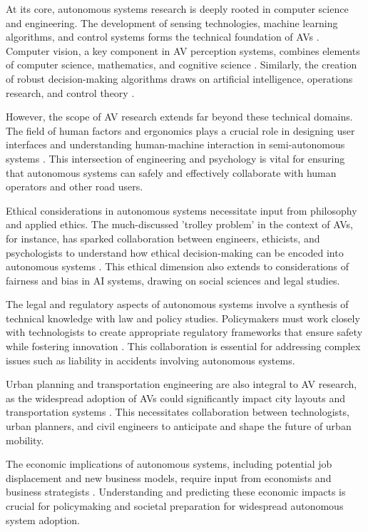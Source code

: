 At its core, autonomous systems research is deeply rooted in computer science and engineering. The development of sensing technologies, machine learning algorithms, and control systems forms the technical foundation of AVs \cite{Yurtsever2020}. Computer vision, a key component in AV perception systems, combines elements of computer science, mathematics, and cognitive science \cite{Grigorescu2020}. Similarly, the creation of robust decision-making algorithms draws on artificial intelligence, operations research, and control theory \cite{Kiran2021}.

However, the scope of AV research extends far beyond these technical domains. The field of human factors and ergonomics plays a crucial role in designing user interfaces and understanding human-machine interaction in semi-autonomous systems \cite{Endsley2017}. This intersection of engineering and psychology is vital for ensuring that autonomous systems can safely and effectively collaborate with human operators and other road users.

Ethical considerations in autonomous systems necessitate input from philosophy and applied ethics. The much-discussed 'trolley problem' in the context of AVs, for instance, has sparked collaboration between engineers, ethicists, and psychologists to understand how ethical decision-making can be encoded into autonomous systems \cite{Awad2018}. This ethical dimension also extends to considerations of fairness and bias in AI systems, drawing on social sciences and legal studies.

The legal and regulatory aspects of autonomous systems involve a synthesis of technical knowledge with law and policy studies. Policymakers must work closely with technologists to create appropriate regulatory frameworks that ensure safety while fostering innovation \cite{Cummings2021}. This collaboration is essential for addressing complex issues such as liability in accidents involving autonomous systems.

Urban planning and transportation engineering are also integral to AV research, as the widespread adoption of AVs could significantly impact city layouts and transportation systems \cite{Duarte2018}. This necessitates collaboration between technologists, urban planners, and civil engineers to anticipate and shape the future of urban mobility.

The economic implications of autonomous systems, including potential job displacement and new business models, require input from economists and business strategists \cite{Autor2015}. Understanding and predicting these economic impacts is crucial for policymaking and societal preparation for widespread autonomous system adoption.

